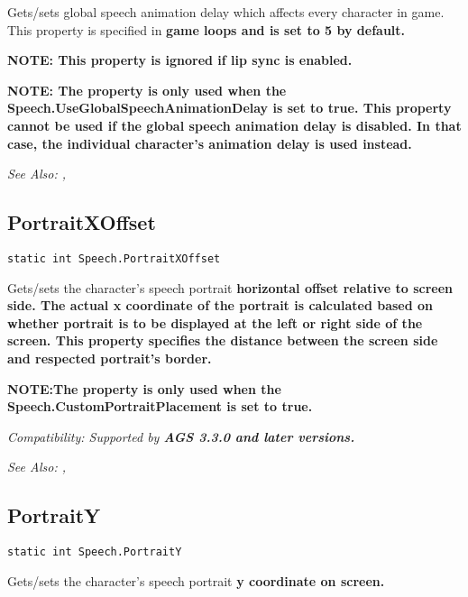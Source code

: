 Gets/sets global speech animation delay which affects every character in game.
This property is specified in \bf{game loops} and is set to 5 by default.

\bf{NOTE:} This property is ignored if lip sync is enabled.

\bf{NOTE:} The property is only used when the \bf{Speech.UseGlobalSpeechAnimationDelay} is set to \bf{true}. This property \bf{cannot} be used if the global speech animation delay is disabled. In that case, the individual character's animation delay is used instead.

\it{See Also:} ,


\subsection{PortraitXOffset}\label{Speech.PortraitXOffset}%

\begin{verbatim}
static int Speech.PortraitXOffset
\end{verbatim}

Gets/sets the character's speech portrait \bf{horizontal} offset relative to screen side.
The actual x coordinate of the portrait is calculated based on whether portrait is to be displayed at the left or right side of the screen. This property specifies the distance between the screen side and respected portrait's border.

\bf{NOTE:}The property is only used when the \bf{Speech.CustomPortraitPlacement} is set to \bf{true}.

\it{Compatibility:} Supported by \bf{AGS 3.3.0} and later versions.

\it{See Also:} ,


\subsection{PortraitY}\label{Speech.PortraitY}%

\begin{verbatim}
static int Speech.PortraitY
\end{verbatim}

Gets/sets the character's speech portrait \bf{y} coordinate on screen.

